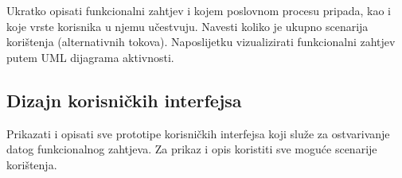 Ukratko opisati funkcionalni zahtjev i kojem poslovnom procesu pripada, kao i koje vrste korisnika u njemu učestvuju. Navesti koliko je ukupno scenarija korištenja (alternativnih tokova). Naposlijetku vizualizirati funkcionalni zahtjev putem UML dijagrama aktivnosti.

\sloppy
\subsection{Dizajn korisničkih interfejsa}

Prikazati i opisati sve prototipe korisničkih interfejsa koji služe za ostvarivanje datog funkcionalnog zahtjeva. Za prikaz i opis koristiti sve moguće scenarije korištenja.